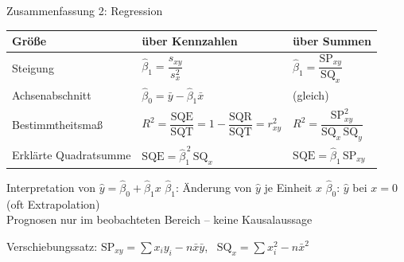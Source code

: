 \documentclass[aspectratio=169,11pt]{beamer}
\newcommand{\SQx}{\text{SQ}_x}
\newcommand{\SQy}{\text{SQ}_y}
\newcommand{\SPxy}{\text{SP}_{xy}}
\begin{document}
\begin{frame}{Zusammenfassung 2: Regression}
  \begin{center}
    \renewcommand{\arraystretch}{1.25}
    \begin{tabular}{@{}l l l@{}}
      \toprule
      \textbf{Größe} & \textbf{über Kennzahlen} & \textbf{über Summen} \\
      \midrule
      Steigung              & $\hat{\beta}_1 = \dfrac{s_{xy}}{s_x^{2}}$         & $\hat{\beta}_1 = \dfrac{\SPxy}{\SQx}$ \\
      Achsenabschnitt       & $\hat{\beta}_0 = \bar{y} - \hat{\beta}_1 \bar{x}$ & (gleich) \\
      Bestimmtheitsmaß      & $R^{2} = \dfrac{\text{SQE}}{\text{SQT}} = 1 - \dfrac{\text{SQR}}{\text{SQT}} = r_{xy}^{2}$
                            & $R^{2} = \dfrac{\SPxy^{2}}{\SQx\,\SQy}$ \\
      Erklärte Quadratsumme & $\text{SQE} = \hat{\beta}_1^{\,2}\,\SQx$          & $\text{SQE} = \hat{\beta}_1\,\SPxy$ \\
      \bottomrule
    \end{tabular}
  \end{center}

  \begin{exampleblock}{Interpretation von $\hat{y} = \hat{\beta}_0 + \hat{\beta}_1 x$}
    \small $\hat{\beta}_1$: Änderung von $\hat{y}$ je Einheit $x$ \qquad
    $\hat{\beta}_0$: $\hat{y}$ bei $x = 0$ (oft Extrapolation)\\
    Prognosen nur im beobachteten Bereich -- keine Kausalaussage
  \end{exampleblock}

  \footnotesize Verschiebungssatz: $\SPxy = \sum x_i y_i - n\bar{x}\bar{y}$, \
  $\SQx = \sum x_i^{2} - n\bar{x}^{2}$
\end{frame}
\end{document}
